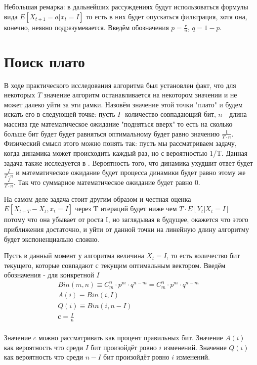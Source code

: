 \documentclass[times]{itmo-student-thesis}
\newcommand{\EY}{E[Y_t| X_t = I]}
\begin{document}
    Небольшая ремарка: в дальнейших рассуждениях будут использоваться формулы вида $E[X_{t+1} = a | x_t = I]$ то есть в них будет опускаться фильтрация, хотя она, конечно, неявно подразумевается.
    Введём обозначения $p = \frac{r}{n}$, $q = 1 - p$.
    \section{Поиск плато}

    В ходе практического исследования алгоритма был установлен факт, что для некоторых $T$ значение алгоритм останавливается на некотором значении и не может далеко уйти за эти рамки.
    Назовём значение этой точки "плато" и будем искать его в следующей точке: пусть $I$- количество совпадающий бит, $n$ - длина массива где математическое ожидание "подняться вверх" то есть на сколько больше бит будет будет равняться оптимальному будет равно значению $\frac{1}{T \cdot  n}$.
    Физический смысл этого можно понять так: пусть мы рассматриваем задачу, когда динамика может происходить каждый раз, но с вероятностью 1/T.
    Данная задача также исследуется в \cite{noise_2} \cite{noise_3}.
    Вероятность того, что динамика ухудшит ответ будет $\frac{I}{T \cdot n}$ и математическое ожидание будет процесса динамики будет равно этому же $\frac{I}{T \cdot n}$.
    Так что суммарное математическое ожидание будет равно 0.

    На самом деле задача стоит другим образом и честная оценка $E[X_{t+T} - X_t, x_t = I]$ через T итераций будет ниже чем $T \cdot \EY$ потому что она убывает от роста I, но заглядывая в будущее, окажется что этого приближения достаточно, и уйти от данной точки на линейную длину алгоритму будет экспоненциально сложно.

    Пусть в данный момент у алгоритма величина $X_t = I$, то есть количество бит текущего, которые совпадают с текущим оптимальным вектором.
    Введём обозначения - для конкретной $I$
    \begin{gather*}
        Bin(m, n) \equiv C_m^n \cdot p^{m} \cdot q^{n - m} = C_m^n \cdot p^{m} \cdot q^{n - m}\\
        A(i) \equiv Bin(i, I)\\
        Q(i) \equiv Bin(i, n - I)\\
        с = \frac{I}{n}\\
    \end{gather*}

    Значение $c$ можно рассматривать как процент правильных бит.
    Значение $A(i)$ как вероятность что среди $I$ бит произойдёт ровно $i$ изменений.
    Значение $Q(i)$ как вероятность что среди $n - I$ бит произойдёт ровно $i$ изменений.
\end{document}
